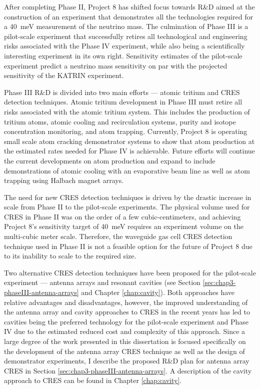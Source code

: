 After completing Phase II, Project 8 has shifted focus towards R\&D aimed at the construction of an experiment that demonstrates all the technologies required for a 40~meV measurement of the neutrino mass. The culmination of Phase III is a pilot-scale experiment that successfully retires all technological and engineering risks associated with the Phase IV experiment, while also being a scientifically interesting experiment in its own right. Sensitivity estimates of the pilot-scale experiment predict a neutrino mass sensitivity on par with the projected sensitivity of the KATRIN experiment. 

Phase III R\&D is divided into two main efforts --- atomic tritium and CRES detection techniques. Atomic tritium development in Phase III must retire all risks associated with the atomic tritium system. This includes the production of tritium atoms, atomic cooling and recirculation systems, purity and isotope concentration monitoring, and atom trapping. Currently, Project 8 is operating small scale atom cracking demonstrator systems to show that atom production at the estimated rates needed for Phase IV is achievable. Future efforts will continue the current developments on atom production and expand to include demonstrations of atomic cooling with an evaporative beam line as well as atom trapping using Halbach magnet arrays.

The need for new CRES detection techniques is driven by the drastic increase in scale from Phase II to the pilot-scale experiments. The physical volume used for CRES in Phase II was on the order of a few cubic-centimeters, and achieving Project 8's sensitivity target of 40~meV requires an experiment volume on the multi-cubic meter scale. Therefore, the waveguide gas cell CRES detection technique used in Phase II is not a feasible option for the future of Project 8 due to its inability to scale to the required size.

Two alternative CRES detection techniques have been proposed for the pilot-scale experiment --- antenna arrays and resonant cavities (see Section \ref{sec:chap3-phaseIII-antenna-arrays} and Chapter \ref{chap:cavity}). Both approaches have relative advantages and disadvantages, however, the improved understanding of the antenna array and cavity approaches to CRES in the recent years has led to cavities being the preferred technology for the pilot-scale experiment and Phase IV due to the estimated reduced cost and complexity of this approach. Since a large degree of the work presented in this dissertation is focused specifically on the development of the antenna array CRES technique as well as the design of demonstrator experiments, I describe the proposed R\&D plan for antenna array CRES in Section \ref{sec:chap3-phaseIII-antenna-arrays}. A description of the cavity approach to CRES can be found in Chapter \ref{chap:cavity}.

